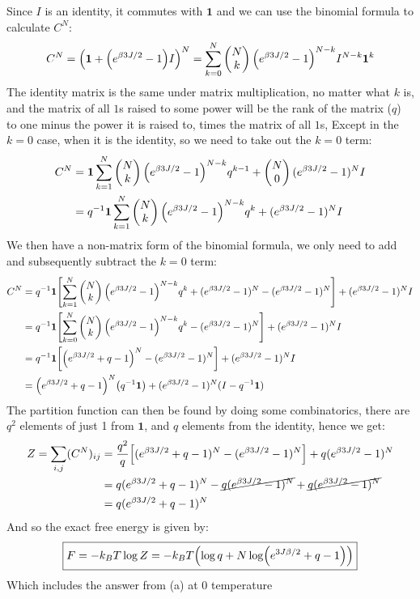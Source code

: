 Since $I$ is an identity, it commutes with $\bm{1}$ and we can use the binomial formula to calculate $C^N$:
\begin{align*}
  C^N=\qty(\bm{1}+\qty(e^{\beta3J/2}-1)I)^N
  =\sum_{k=0}^N\pmqty{N\\k}\qty(e^{\beta3J/2}-1)^{N-k}I^{N-k}\bm{1}^{k}
\end{align*}
The identity matrix is the same under matrix multiplication, no matter what $k$ is, and the matrix of all $1$s raised to some power will be the rank of the matrix ($q$) to one minus the power it is raised to, times the matrix of all $1$s, Except in the $k=0$ case, when it is the identity, so we need to take out the $k=0$ term:
\begin{align*}
  C^N&=\bm{1}\sum_{k=1}^N\pmqty{N\\k}\qty(e^{\beta3J/2}-1)^{N-k}q^{k-1}+
  \pmqty{N\\0}(e^{\beta3J/2}-1)^NI\\
  &=q^{-1}\bm{1}\sum_{k=1}^N\pmqty{N\\k}\qty(e^{\beta3J/2}-1)^{N-k}q^{k}+
  (e^{\beta3J/2}-1)^NI
\end{align*}
We then have a non-matrix form of the binomial formula, we only need to add and subsequently subtract the $k=0$ term:
\begin{align*}
  C^N&=q^{-1}\bm{1}\qty[\sum_{k=1}^N\pmqty{N\\k}\qty(e^{\beta3J/2}-1)^{N-k}q^{k}
  +(e^{\beta3J/2}-1)^N-(e^{\beta3J/2}-1)^N]+(e^{\beta3J/2}-1)^NI\\
  &=q^{-1}\bm{1}\qty[\sum_{k=0}^N\pmqty{N\\k}\qty(e^{\beta3J/2}-1)^{N-k}q^{k}
  -(e^{\beta3J/2}-1)^N]+(e^{\beta3J/2}-1)^NI\\
  &=q^{-1}\bm{1}\qty[\qty(e^{\beta3J/2}+q-1)^N-(e^{\beta3J/2}-1)^N]
  +(e^{\beta3J/2}-1)^NI\\
  &=\qty(e^{\beta3J/2}+q-1)^N\qty(q^{-1}\bm{1})
  +(e^{\beta3J/2}-1)^N(I-q^{-1}\bm{1})
\end{align*}
The partition function can then be found by doing some combinatorics, there are $q^2$ elements of just 1 from $\bm{1}$, and $q$ elements from the identity, hence we get:
\begin{align*}
  Z=\sum_{i,j}(C^N)_{ij}&=
  \frac{q^2}{q}\qty[(e^{\beta3J/2}+q-1)^N-(e^{\beta3J/2}-1)^N]
  +q(e^{\beta3J/2}-1)^N\\
  &=q(e^{\beta3J/2}+q-1)^N
  -\cancel{q(e^{\beta3J/2}-1)^N}+\cancel{q(e^{\beta3J/2}-1)^N}\\
  &=q(e^{\beta3J/2}+q-1)^N
\end{align*}
And so the exact free energy is given by:
\begin{align}
  \boxed{F=-k_BT \log Z=-k_BT\qty(\log q+N\log(e^{3J\beta/2}+q-1))}
\end{align}
Which includes the answer from (a) at $0$ temperature 

